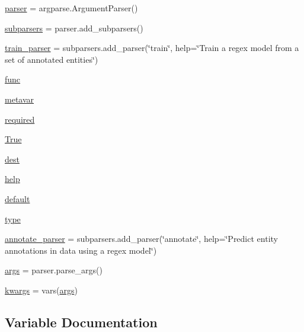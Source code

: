 \begin{DoxyCompactItemize}
\item 
\hyperlink{namespacetask6_1_1anafora_1_1regex_acaa0f4da8edebdfcc3082c9aead0b84b}{parser} = argparse.\+Argument\+Parser()
\item 
\hyperlink{namespacetask6_1_1anafora_1_1regex_a7bff6e8b5808507c7d6a504f05e97262}{subparsers} = parser.\+add\+\_\+subparsers()
\item 
\hyperlink{namespacetask6_1_1anafora_1_1regex_a6aee15f4107592140f9c64baf45fc73a}{train\+\_\+parser} = subparsers.\+add\+\_\+parser(\char`\"{}train\char`\"{}, help=\char`\"{}Train a regex model from a set of annotated entities\char`\"{})
\item 
\hyperlink{namespacetask6_1_1anafora_1_1regex_afea9962ba3d4bd4ca9a352152548e7bb}{func}
\item 
\hyperlink{namespacetask6_1_1anafora_1_1regex_ac12691e9aba6f1aefab1088d7866e01e}{metavar}
\item 
\hyperlink{namespacetask6_1_1anafora_1_1regex_acefb9555f21dc21bea98cb3ac22df79f}{required}
\item 
\hyperlink{namespacetask6_1_1anafora_1_1regex_afdcd6d13234a16e2d8e0935202acbd94}{True}
\item 
\hyperlink{namespacetask6_1_1anafora_1_1regex_a28c41a8a70660dd758f3639be181a1f3}{dest}
\item 
\hyperlink{namespacetask6_1_1anafora_1_1regex_a52ae070e5878b993e9ccb1ebd639ee11}{help}
\item 
\hyperlink{namespacetask6_1_1anafora_1_1regex_a68449a951377ad4fc0bc7a04010d5c05}{default}
\item 
\hyperlink{namespacetask6_1_1anafora_1_1regex_acac1830f99ebd231d098dc64c844980d}{type}
\item 
\hyperlink{namespacetask6_1_1anafora_1_1regex_a181daf3aa7a313d75a4d761a19e71479}{annotate\+\_\+parser} = subparsers.\+add\+\_\+parser(\char`\"{}annotate\char`\"{}, help=\char`\"{}Predict entity annotations in data using a regex model\char`\"{})
\item 
\hyperlink{namespacetask6_1_1anafora_1_1regex_a423344413dd80a857794200e7d36660b}{args} = parser.\+parse\+\_\+args()
\item 
\hyperlink{namespacetask6_1_1anafora_1_1regex_a7775f13f66b9f77c366bafb1f5746659}{kwargs} = vars(\hyperlink{namespacetask6_1_1anafora_1_1regex_a423344413dd80a857794200e7d36660b}{args})
\end{DoxyCompactItemize}


\subsection{Variable Documentation}
\mbox{\label{namespacetask6_1_1anafora_1_1regex_a181daf3aa7a313d75a4d761a19e71479}} 
